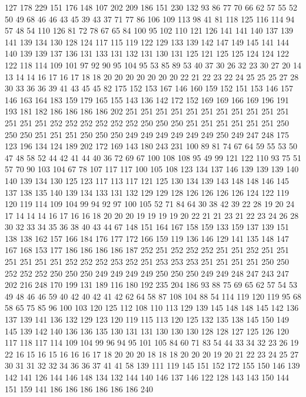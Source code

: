 127 178 229 151 176 148 107 202 209 186 151 230 132 93 86 77 70 66 62 57
55 52 50 49 68 46 46 43 45 39 43 37 71 77 86 106 109 113 98 41
81 118 125 116 114 94 57 48 54 110 126 81 72 78 67 65 84 100 95 102
110 121 126 141 141 140 137 139 141 139 134 130 128 124 117 115 119 122 129 133
139 142 147 149 145 141 144 140 139 139 137 136 131 133 131 132 131 130 131 125
121 125 125 124 124 122 122 118 114 109 101 97 92 90 95 104 95 53 85 89
53 40 37 30 26 32 23 30 27 20 14 13 14 14 16 17 16 17 18 18
20 20 20 20 20 20 20 22 21 22 23 22 24 25 25 25 27 28 30 33
36 36 39 41 43 45 45 82 175 152 153 167 146 160 159 152 151 153 146 157
146 163 164 183 159 179 165 155 143 136 142 172 152 169 169 166 169 196 191 193
181 182 186 186 186 186 202 251 251 251 251 251 251 251 251 251 251 251 251 251
251 252 252 252 252 252 252 250 250 250 251 251 251 251 251 251 250 250 250 251
251 251 250 250 250 249 249 249 249 249 249 250 249 247 248 175 123 196 134 124
189 202 172 169 143 180 243 231 100 89 81 74 67 64 59 55 53 50 47 48
58 52 44 42 41 44 40 36 72 69 67 100 108 108 95 49 99 121 122 110
93 75 51 57 70 90 103 104 67 78 107 117 117 100 105 108 123 134 137 146
139 139 139 140 140 139 134 130 125 123 117 113 117 121 125 130 134 139 143 148
148 146 145 137 138 135 140 139 134 133 131 132 129 129 128 126 126 126 126 124
122 119 120 119 114 109 104 99 94 92 97 100 105 52 71 84 64 30 38 42
39 22 28 19 20 24 17 14 14 14 16 17 16 16 18 20 20 20 19 19
19 19 20 22 21 21 23 21 22 23 24 26 28 30 32 33 34 35 36 38
40 43 44 67 148 151 164 167 158 159 133 159 137 139 151 138 138 162 157 166
184 176 177 172 166 159 119 136 146 129 141 135 148 147 167 168 153 177 186 186
186 186 187 252 251 252 252 252 251 251 252 251 251 251 251 251 251 252 252 252
253 252 251 253 253 253 251 251 251 251 250 250 252 252 252 250 250 250 249 249
249 249 250 250 250 249 249 248 247 243 247 202 216 248 170 199 131 189 116 180
192 235 204 186 93 88 75 69 65 62 57 54 53 49 48 46 46 59 40 42
40 42 41 42 62 64 58 87 108 104 88 54 114 119 120 119 95 68 58 65
75 85 96 100 103 120 125 112 108 110 113 129 139 145 148 148 145 142 136 137
139 141 136 132 129 123 120 119 115 113 120 125 132 135 138 145 150 149 145 139
142 140 136 136 135 130 131 131 130 130 130 128 128 127 125 126 120 117 118 117
114 109 104 99 96 94 95 101 105 84 60 71 83 54 44 33 34 32 23 26
19 22 16 15 16 15 16 16 16 17 18 20 20 20 18 18 18 20 20 20
19 20 21 22 23 24 25 27 30 31 31 32 32 34 36 36 37 41 41 58
139 111 119 145 151 152 172 155 150 146 139 142 141 126 144 146 148 134 132 144
140 146 137 146 122 128 143 143 150 144 151 159 141 186 186 186 186 186 186 240
